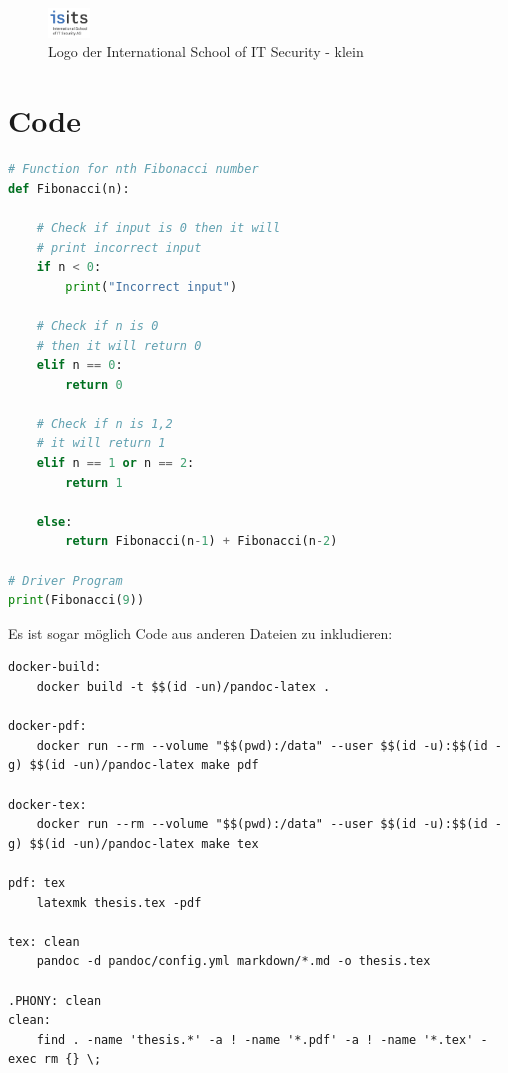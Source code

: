 \documentclass[
  11pt,
  a4paper,
  openright,
  cleardoublepage=plain,
  parskip=half+, %
]{scrreprt}
\begin{document}
\begin{figure}
\hypertarget{fig:logo-isits-small}{%
\centering
\includegraphics[width=0.1\textwidth,height=\textheight]{././data/logo/isits-logo.jpg}
\caption{Logo der International School of IT Security -
klein}\label{fig:logo-isits-small}
}
\end{figure}

\hypertarget{code}{%
\section{Code}\label{code}}

\begin{lstlisting}[language=Python, caption={Fibonacci-Algorithmus in Python}, label={alg:fibonacci-python}]
# Function for nth Fibonacci number
def Fibonacci(n):
   
    # Check if input is 0 then it will
    # print incorrect input
    if n < 0:
        print("Incorrect input")
 
    # Check if n is 0
    # then it will return 0
    elif n == 0:
        return 0
 
    # Check if n is 1,2
    # it will return 1
    elif n == 1 or n == 2:
        return 1
 
    else:
        return Fibonacci(n-1) + Fibonacci(n-2)
 
# Driver Program
print(Fibonacci(9))
\end{lstlisting}

Es ist sogar möglich Code aus anderen Dateien zu inkludieren:

\begin{lstlisting}[caption=Makefile, label={alg:makefile}]
docker-build:
	docker build -t $$(id -un)/pandoc-latex .

docker-pdf:
	docker run --rm --volume "$$(pwd):/data" --user $$(id -u):$$(id -g) $$(id -un)/pandoc-latex make pdf

docker-tex:
	docker run --rm --volume "$$(pwd):/data" --user $$(id -u):$$(id -g) $$(id -un)/pandoc-latex make tex

pdf: tex
	latexmk thesis.tex -pdf

tex: clean
	pandoc -d pandoc/config.yml markdown/*.md -o thesis.tex

.PHONY: clean
clean:
	find . -name 'thesis.*' -a ! -name '*.pdf' -a ! -name '*.tex' -exec rm {} \;
\end{lstlisting}
\end{document}
